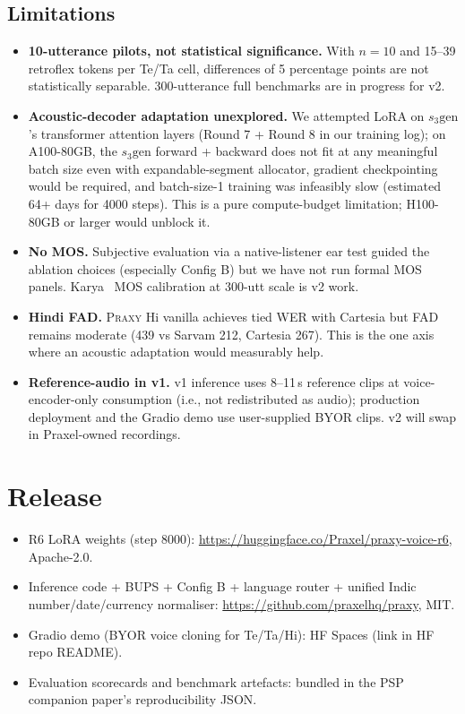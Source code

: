 \documentclass[conference,a4paper]{IEEEtran}
\newcommand{\psp}{\textsc{PSP}}
\newcommand{\praxy}{\textsc{Praxy}}
\newcommand{\configb}{Config B}
\begin{document}
\subsection{Limitations}
\label{sec:failure_mode}
\begin{itemize}
  \item \textbf{10-utterance pilots, not statistical significance.} With $n=10$ and 15--39 retroflex tokens per Te/Ta cell, differences of 5 percentage points are not statistically separable. 300-utterance full benchmarks are in progress for v2.
  \item \textbf{Acoustic-decoder adaptation unexplored.} We attempted LoRA on $s_3\text{gen}$'s transformer attention layers (Round 7 + Round 8 in our training log); on A100-80GB, the $s_3\text{gen}$ forward + backward does not fit at any meaningful batch size even with expandable-segment allocator, gradient checkpointing would be required, and batch-size-1 training was infeasibly slow (estimated 64+ days for 4000 steps). This is a pure compute-budget limitation; H100-80GB or larger would unblock it.
  \item \textbf{No MOS.} Subjective evaluation via a native-listener ear test guided the ablation choices (especially \configb) but we have not run formal MOS panels. Karya~\cite{karya2025} MOS calibration at 300-utt scale is v2 work.
  \item \textbf{Hindi FAD.} \praxy{} Hi vanilla achieves tied WER with Cartesia but FAD remains moderate (439 vs Sarvam 212, Cartesia 267). This is the one axis where an acoustic adaptation would measurably help.
  \item \textbf{Reference-audio in v1.} v1 inference uses 8--11\,s reference clips at voice-encoder-only consumption (i.e., not redistributed as audio); production deployment and the Gradio demo use user-supplied BYOR clips. v2 will swap in Praxel-owned recordings.
\end{itemize}

\section{Release}
\label{sec:release}
\begin{itemize}
  \item R6 LoRA weights (step 8000): \url{https://huggingface.co/Praxel/praxy-voice-r6}, Apache-2.0.
  \item Inference code + BUPS + \configb{} + language router + unified Indic number/date/currency normaliser: \url{https://github.com/praxelhq/praxy}, MIT.
  \item Gradio demo (BYOR voice cloning for Te/Ta/Hi): HF Spaces (link in HF repo README).
  \item Evaluation scorecards and benchmark artefacts: bundled in the \psp{}~\cite{psp2026} companion paper's reproducibility JSON.
\end{itemize}
\end{document}

